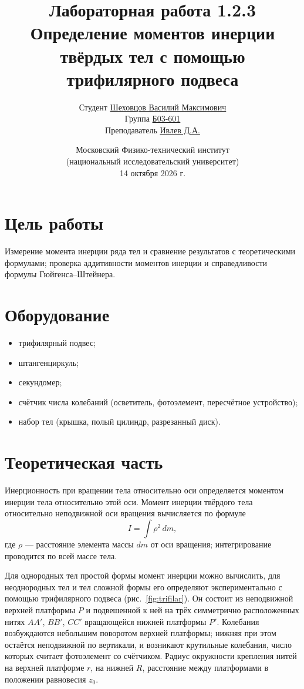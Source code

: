 \documentclass[12pt,a4paper]{article}
\title{\textbf{Лабораторная работа 1.2.3}\\
Определение моментов инерции твёрдых тел с помощью трифилярного подвеса}
\author{
    Студент \underline{Шеховцов Василий Максимович}\\
    Группа \underline{Б03-601}\\
    Преподаватель \underline{Ивлев Д.А.}
}
\date{Московский Физико-технический институт\\
(национальный исследовательский университет)\\
14 октября 2026 г.}
\begin{document}
\maketitle

\section*{Цель работы}

Измерение момента инерции ряда тел и сравнение результатов с теоретическими формулами; проверка аддитивности моментов инерции и справедливости формулы Гюйгенса--Штейнера.

\section*{Оборудование}

\begin{itemize}
    \item трифилярный подвес;
    \item штангенциркуль;
    \item секундомер;
    \item счётчик числа колебаний (осветитель, фотоэлемент, пересчётное устройство);
    \item набор тел (крышка, полый цилиндр, разрезанный диск).
\end{itemize}

\section*{Теоретическая часть}

Инерционность при вращении тела относительно оси определяется моментом инерции тела относительно этой оси. Момент инерции твёрдого тела относительно неподвижной оси вращения вычисляется по формуле
\begin{equation}
    I = \int \rho^2 \, dm,
\end{equation}
где \(\rho\) --- расстояние элемента массы \(dm\) от оси вращения; интегрирование проводится по всей массе тела.

Для однородных тел простой формы момент инерции можно вычислить, для неоднородных тел и тел сложной формы его определяют экспериментально с помощью трифилярного подвеса (рис.~\ref{fig:trifilar}). Он состоит из неподвижной верхней платформы \(P\) и подвешенной к ней на трёх симметрично расположенных нитях \(AA'\), \(BB'\), \(CC'\) вращающейся нижней платформы \(P'\). Колебания возбуждаются небольшим поворотом верхней платформы; нижняя при этом остаётся неподвижной по вертикали, и возникают крутильные колебания, число которых считает фотоэлемент со счётчиком. Радиус окружности крепления нитей на верхней платформе \(r\), на нижней \(R\), расстояние между платформами в положении равновесия \(z_0\).
\end{document}
